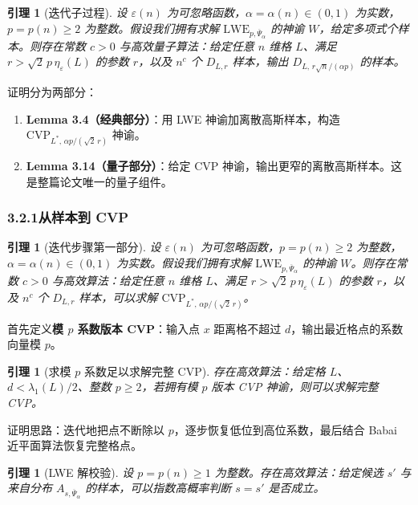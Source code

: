 \documentclass[11pt,a4paper]{article}
\newtheorem{lemma}[theorem]{引理}
\newcommand{\Psibar}{\overline{\Psi}}
\begin{document}
\begin{lemma}[迭代子过程]
设 $\varepsilon(n)$ 为可忽略函数，$\alpha=\alpha(n)\in(0,1)$ 为实数，$p=p(n)\ge 2$ 为整数。假设我们拥有求解 $\mathrm{LWE}_{p,\Psibar_{\alpha}}$ 的神谕 $W$，给定多项式个样本。则存在常数 $c>0$ 与高效量子算法：给定任意 $n$ 维格 $L$、满足 $r>\sqrt{2}\,p\,\eta_{\varepsilon}(L)$ 的参数 $r$，以及 $n^{c}$ 个 $D_{L,r}$ 样本，输出 $D_{L,\,r\sqrt{n}/(\alpha p)}$ 的样本。
\end{lemma}

证明分为两部分：

\begin{enumerate}[label=\arabic*.]
  \item \textbf{Lemma 3.4（经典部分）}：用 LWE 神谕加离散高斯样本，构造 $\mathrm{CVP}_{L^{*},\,\alpha p/(\sqrt{2}\,r)}$ 神谕。
  \item \textbf{Lemma 3.14（量子部分）}：给定 CVP 神谕，输出更窄的离散高斯样本。这是整篇论文唯一的量子组件。
\end{enumerate}

\subsubsection*{3.2.1\quad 从样本到 CVP}

\begin{lemma}[迭代步骤第一部分]
设 $\varepsilon(n)$ 为可忽略函数，$p=p(n)\ge 2$ 为整数，$\alpha=\alpha(n)\in(0,1)$ 为实数。假设我们拥有求解 $\mathrm{LWE}_{p,\Psibar_{\alpha}}$ 的神谕 $W$。则存在常数 $c>0$ 与高效算法：给定任意 $n$ 维格 $L$、满足 $r>\sqrt{2}\,p\,\eta_{\varepsilon}(L)$ 的参数 $r$，以及 $n^{c}$ 个 $D_{L,r}$ 样本，可以求解 $\mathrm{CVP}_{L^{*},\,\alpha p/(\sqrt{2}\,r)}$。
\end{lemma}

首先定义\textbf{模 $p$ 系数版本 CVP}：输入点 $x$ 距离格不超过 $d$，输出最近格点的系数向量模 $p$。

\begin{lemma}[求模 $p$ 系数足以求解完整 CVP]
存在高效算法：给定格 $L$、$d<\lambda_{1}(L)/2$、整数 $p\ge 2$，若拥有模 $p$ 版本 CVP 神谕，则可以求解完整 CVP。
\end{lemma}

证明思路：迭代地把点不断除以 $p$，逐步恢复低位到高位系数，最后结合 Babai 近平面算法恢复完整格点。

\begin{lemma}[LWE 解校验]
设 $p=p(n)\ge 1$ 为整数。存在高效算法：给定候选 $s'$ 与来自分布 $A_{s,\Psibar_{\alpha}}$ 的样本，可以指数高概率判断 $s=s'$ 是否成立。
\end{lemma}
\end{document}
